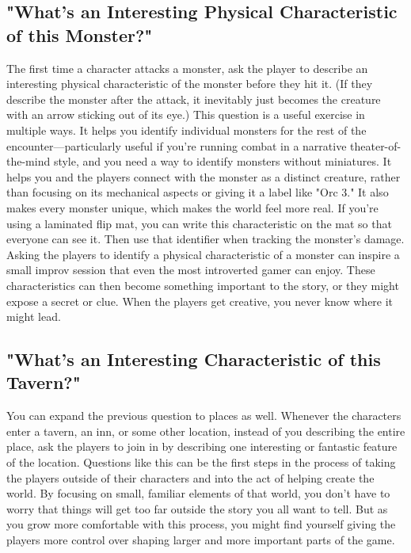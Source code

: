 \documentclass[10pt,a4paper,twoside,bg=print,twocolumn,openany,nodeprecatedcode]{dndbook}
\begin{document}
\subsection{"What's an Interesting Physical Characteristic of this Monster?"}
The first time a character attacks a monster, ask the player to describe an interesting physical characteristic of the monster before they hit it. (If they describe the monster after the attack, it inevitably just becomes the creature with an arrow sticking out of its eye.)
This question is a useful exercise in multiple ways. It helps you identify individual monsters for the rest of the encounter—particularly useful if you're running combat in a narrative theater-of-the-mind style, and you need a way to identify monsters without miniatures. It helps you and the players connect with the monster as a distinct creature, rather than focusing on its mechanical aspects or giving it a label like "Orc 3." It also makes every monster unique, which makes the world feel more real.
If you're using a laminated flip mat, you can write this characteristic on the mat so that everyone can see it. Then use that identifier when tracking the monster's damage.
Asking the players to identify a physical characteristic of a monster can inspire a small improv session that even the most introverted gamer can enjoy. These characteristics can then become something important to the story, or they might expose a secret or clue. When the players get creative, you never know where it might lead.
\subsection{"What's an Interesting Characteristic of this Tavern?"}
You can expand the previous question to places as well. Whenever the characters enter a tavern, an inn, or some other location, instead of you describing the entire place, ask the players to join in by describing one interesting or fantastic feature of the location.
Questions like this can be the first steps in the process of taking the players outside of their characters and into the act of helping create the world. By focusing on small, familiar elements of that world, you don't have to worry that things will get too far outside the story you all want to tell. But as you grow more comfortable with this process, you might find yourself giving the players more control over shaping larger and more important parts of the game.
\end{document}

